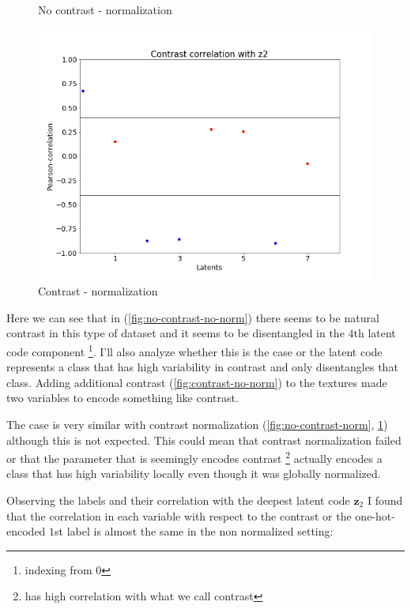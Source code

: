 \documentclass[12pt, english]{article}
\begin{document}
\begin{figure}[H]
\begin{minipage}[b]{0.5\linewidth}
    \caption{No contrast - normalization} 
    \label{fig:no-contrast-norm}
  \end{minipage}%
  \begin{minipage}[b]{0.5\linewidth}
    \centering
    \includegraphics[width=.72\linewidth]{contrast_to_latent/norm_contrast_correlation.png} 
    \caption{Contrast - normalization} 
    \label{fig:contrast-norm}
  \end{minipage} 
\end{figure}

\vspace{4mm}

\par Here we can see that in (\ref{fig:no-contrast-no-norm}) there seems to be natural contrast in this type of dataset and it seems to be disentangled in the $4$th latent code component \footnote{indexing from $0$}. I'll also analyze whether this is the case or the latent code represents a class that has high variability in contrast and only disentangles that class. Adding additional contrast (\ref{fig:contrast-no-norm}) to the textures made two variables to encode something like contrast.

\vspace{4mm}

\par The case is very similar with contrast normalization (\ref{fig:no-contrast-norm}, \ref{fig:contrast-norm}) although this is not expected. This could mean that contrast normalization failed or that the parameter that is seemingly encodes contrast \footnote{has high correlation with what we call contrast} actually encodes a class that has high variability locally even though it was globally normalized.

\vspace{4mm}

\par Observing the labels and their correlation with the deepest latent code $\bm{z}_{2}$ I found that the correlation in each variable with respect to the contrast or the one-hot-encoded $1$st label is almost the same in the non normalized setting:
\end{document}
